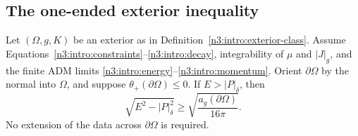 \subsection{The one-ended exterior inequality}

\begin{theorem}\label{n3:intro:exterior-inequality}
Let \((\Omega,g,K)\) be an exterior as in
Definition~\ref{n3:intro:exterior-class}. Assume
Equations~\eqref{n3:intro:constraints}--\eqref{n3:intro:decay}, integrability
of \(\mu\) and \(|J|_g\), and the finite ADM limits
\eqref{n3:intro:energy}--\eqref{n3:intro:momentum}. Orient \(\partial\Omega\)
by the normal into \(\Omega\), and suppose
\(\theta_+(\partial\Omega)\le0\). If \(E>|P|_\delta\), then
\begin{equation}\label{n3:intro:penrose}
          \sqrt{E^2-|P|_\delta^2}
               \ge \sqrt{\frac{a_g(\partial\Omega)}{16\pi}}.
\end{equation}
No extension of the data across \(\partial\Omega\) is required.
\end{theorem}
